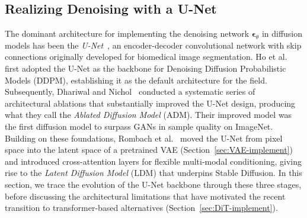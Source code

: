 \documentclass[../../book-main.tex]{subfiles}
\begin{document}

\subsection{Realizing Denoising with a U-Net}
\label{sec:UNet-implement}

The dominant architecture for implementing the denoising network
$\boldsymbol{\epsilon}_\theta$ in diffusion models has been the
\textit{U-Net}~\citep{ronneberger2015unet}, an encoder-decoder
convolutional network with skip connections originally developed for
biomedical image segmentation. Ho et al.~\citep{ho2020denoising}
first adopted the U-Net as the backbone for Denoising Diffusion
Probabilistic Models (DDPM), establishing it as the default
architecture for the field. Subsequently, Dhariwal and
Nichol~\citep{dhariwal2021diffusion} conducted a systematic series of
architectural ablations that substantially improved the U-Net design,
producing what they call the \emph{Ablated Diffusion Model} (ADM).
Their improved model was the first diffusion model to surpass GANs in
sample quality on ImageNet. Building on these foundations, Rombach et
al.~\citep{rombach2022high} moved the U-Net from pixel space into the
latent space of a pretrained VAE (Section~\ref{sec:VAE-implement})
and introduced cross-attention layers for flexible multi-modal
conditioning, giving rise to the \emph{Latent Diffusion Model} (LDM)
that underpins Stable Diffusion. In this section, we trace the
evolution of the U-Net backbone through these three stages, before
discussing the architectural limitations that have motivated the
recent transition to transformer-based alternatives
(Section~\ref{sec:DiT-implement}).
\end{document}
